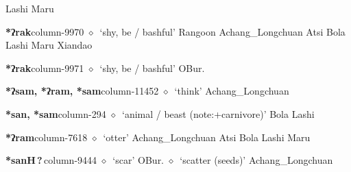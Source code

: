          Lashi 
\hspace{1ex}
         Maru 
  \item {\footnotesize \textbf{*ʔrak}}{\tiny column-9970}
         $\diamond$~`shy, be / bashful'
         Rangoon 
\hspace{1ex}
         Achang\_Longchuan 
\hspace{1ex}
         Atsi 
\hspace{1ex}
         Bola 
\hspace{1ex}
         Lashi 
\hspace{1ex}
         Maru 
\hspace{1ex}
         Xiandao 
  \item {\footnotesize \textbf{*ʔrak}}{\tiny column-9971}
         $\diamond$~`shy, be / bashful'
         OBur. 
  \item {\footnotesize \textbf{*ʔsam, *ʔram, *sam}}{\tiny column-11452}
         $\diamond$~`think'
         Achang\_Longchuan 
  \item {\footnotesize \textbf{*san, *sam}}{\tiny column-294}
         $\diamond$~`animal / beast (note:+carnivore)'
         Bola 
\hspace{1ex}
         Lashi 
  \item {\footnotesize \textbf{*ʔram}}{\tiny column-7618}
         $\diamond$~`otter'
         Achang\_Longchuan 
\hspace{1ex}
         Atsi 
\hspace{1ex}
         Bola 
\hspace{1ex}
         Lashi 
\hspace{1ex}
         Maru 
  \item {\footnotesize \textbf{*sanH\,?\,}}{\tiny column-9444}
         $\diamond$~`scar'
         OBur. 
\hspace{1ex}
         $\diamond$~`scatter (seeds)'
         Achang\_Longchuan 
